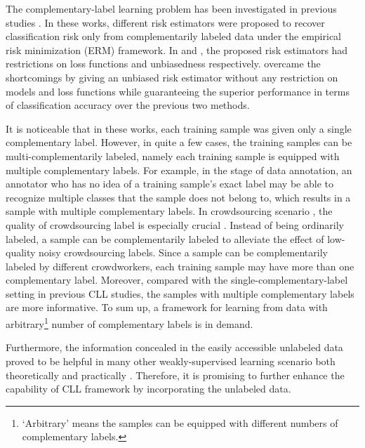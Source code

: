 \documentclass[]{article} \usepackage{geometry}
\begin{document}
The complementary-label learning problem has been investigated in previous studies \cite{DBLP:conf/nips/IshidaNHS17,DBLP:conf/eccv/YuLGT18,DBLP:conf/icml/IshidaNMS19}. In these works, different risk estimators were proposed to recover classification risk only from complementarily labeled data under the empirical risk minimization (ERM) framework. In \cite{DBLP:conf/nips/IshidaNHS17} and \cite{DBLP:conf/eccv/YuLGT18}, the proposed risk estimators had restrictions on loss functions and unbiasedness respectively. \cite{DBLP:conf/icml/IshidaNMS19} overcame the shortcomings by giving an unbiased risk estimator without any restriction on models and loss functions while guaranteeing the superior performance in terms of classification accuracy over the previous two methods.

It is noticeable that in these works, each training sample was given only a single complementary label. However, in quite a few cases, the training samples can be multi-complementarily labeled, namely each training sample is equipped with multiple complementary labels. For example, in the stage of data annotation, an annotator who has no idea of a training sample's exact label may be able to recognize multiple classes that the sample does not belong to, which results in a sample with multiple complementary labels. In crowdsourcing scenario \cite{Crowdsourcing,CS}, the quality of crowdsourcing label is especially crucial \cite{DBLP:journals/chinaf/WangZ15a}. Instead of being ordinarily labeled, a sample can be complementarily labeled to alleviate the effect of low-quality noisy crowdsourcing labels. Since a sample can be complementarily labeled by different crowdworkers, each training sample may have more than one complementary label. Moreover, compared with the single-complementary-label setting in previous CLL studies, the samples with multiple complementary labels are more informative. To sum up, a framework for learning from data with arbitrary\footnote{ `Arbitrary' means the samples can be equipped with different numbers of complementary labels.} number of complementary labels is in demand.

Furthermore, the information concealed in the easily accessible unlabeled data proved to be helpful in many other weakly-supervised learning scenario both theoretically and practically \cite{shai,incomplete,partial_unlabeled}. Therefore, it is promising to further enhance the capability of CLL framework by incorporating the unlabeled data.
\end{document}
